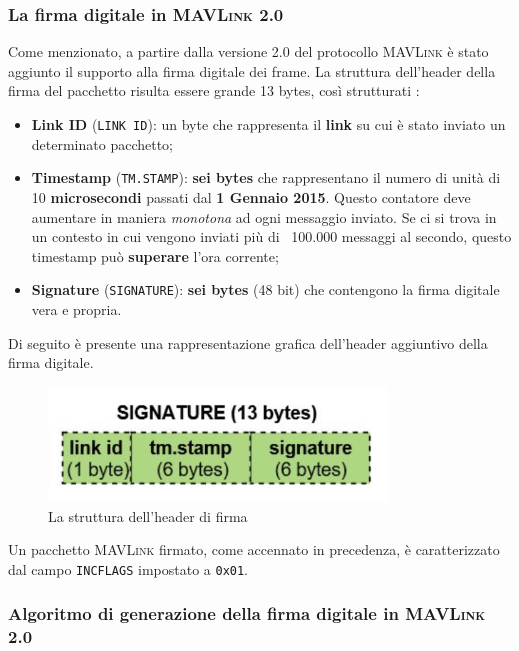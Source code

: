 \documentclass[a4paper, 12pt, oneside]{article}
\theoremstyle{definition}
\begin{document}
\subsubsection{La firma digitale in \textsc{MAVLink} 2.0}
Come menzionato, a partire dalla versione 2.0 del protocollo \textsc{MAVLink} è stato aggiunto il supporto alla firma digitale dei frame. La struttura dell'header della firma del pacchetto risulta essere grande 13 bytes, così strutturati \cite{sign-frame-fotmat}:

\begin{itemize}
    \item \textbf{Link ID} (\texttt{LINK ID}): un byte che rappresenta il \textbf{link} su cui è stato inviato un determinato pacchetto;
    \item \textbf{Timestamp} (\texttt{TM.STAMP}): \textbf{sei bytes} che rappresentano il numero di unità di 10 \textbf{microsecondi} passati dal \textbf{1 Gennaio 2015}. Questo contatore deve aumentare in maniera \textit{monotona} ad ogni messaggio inviato. Se ci si trova in un contesto in cui vengono inviati più di ~100.000 messaggi al secondo, questo timestamp può \textbf{superare} l'ora corrente;
    \item \textbf{Signature} (\texttt{SIGNATURE}): \textbf{sei bytes} (48 bit) che contengono la firma digitale vera e propria.
\end{itemize}

Di seguito è presente una rappresentazione grafica dell'header aggiuntivo della firma digitale.

\begin{figure}[H]
    \centering
    \includegraphics[width=0.8\textwidth]{images/mavlink2-signature.png}
    \caption{La struttura dell'header di firma}
\end{figure}

Un pacchetto \textsc{MAVLink} firmato, come accennato in precedenza, è caratterizzato dal campo \texttt{INCFLAGS} impostato a \texttt{0x01}.

\newpage

\subsubsection{Algoritmo di generazione della firma digitale in \textsc{MAVLink} 2.0}
\end{document}
